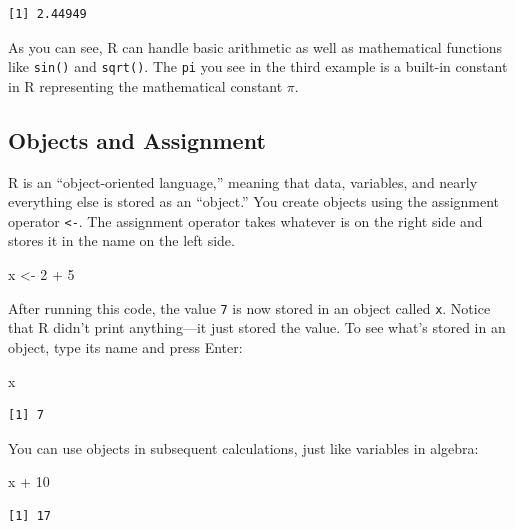 \documentclass[
  letterpaper,
  DIV=11,
  numbers=noendperiod]{scrreprt}
\newenvironment{Shaded}{\begin{snugshade}}{\end{snugshade}}
\newcommand{\DecValTok}[1]{\textcolor[rgb]{0.68,0.00,0.00}{#1}}
\newcommand{\NormalTok}[1]{\textcolor[rgb]{0.00,0.23,0.31}{#1}}
\newcommand{\OtherTok}[1]{\textcolor[rgb]{0.00,0.23,0.31}{#1}}
\newcommand{\SpecialCharTok}[1]{\textcolor[rgb]{0.37,0.37,0.37}{#1}}
\begin{document}
\begin{verbatim}
[1] 2.44949
\end{verbatim}

As you can see, R can handle basic arithmetic as well as mathematical
functions like \texttt{sin()} and \texttt{sqrt()}. The \texttt{pi} you
see in the third example is a built-in constant in R representing the
mathematical constant \(\pi\).

\subsection{Objects and Assignment}\label{objects-and-assignment}

R is an ``object-oriented language,'' meaning that data, variables, and
nearly everything else is stored as an ``object.'' You create objects
using the assignment operator \texttt{\textless{}-}. The assignment
operator takes whatever is on the right side and stores it in the name
on the left side.

\begin{Shaded}
\begin{Highlighting}[]
\NormalTok{x }\OtherTok{\textless{}{-}} \DecValTok{2} \SpecialCharTok{+} \DecValTok{5}
\end{Highlighting}
\end{Shaded}

After running this code, the value \texttt{7} is now stored in an object
called \texttt{x}. Notice that R didn't print anything---it just stored
the value. To see what's stored in an object, type its name and press
Enter:

\begin{Shaded}
\begin{Highlighting}[]
\NormalTok{x}
\end{Highlighting}
\end{Shaded}

\begin{verbatim}
[1] 7
\end{verbatim}

You can use objects in subsequent calculations, just like variables in
algebra:

\begin{Shaded}
\begin{Highlighting}[]
\NormalTok{x }\SpecialCharTok{+} \DecValTok{10}
\end{Highlighting}
\end{Shaded}

\begin{verbatim}
[1] 17
\end{verbatim}
\end{document}
